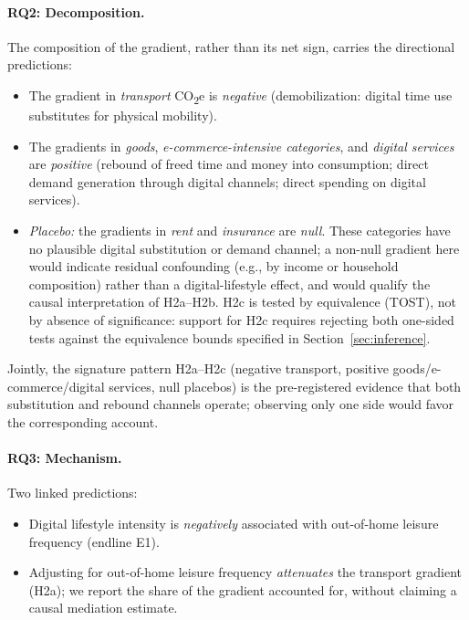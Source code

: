 \documentclass[11pt,a4paper]{article}
\begin{document}
\paragraph{RQ2: Decomposition.} The composition of the gradient, rather than its
net sign, carries the directional predictions:
\begin{itemize}
  \item[H2a.] The gradient in \emph{transport} CO\textsubscript{2}e is
    \emph{negative} (demobilization: digital time use substitutes for physical
    mobility).
  \item[H2b.] The gradients in \emph{goods}, \emph{e-commerce-intensive
    categories}, and \emph{digital services} are \emph{positive} (rebound of
    freed time and money into consumption; direct demand generation through
    digital channels; direct spending on digital services).
  \item[H2c.] \emph{Placebo:} the gradients in \emph{rent} and \emph{insurance}
    are \emph{null}. These categories have no plausible digital substitution or
    demand channel; a non-null gradient here would indicate residual confounding
    (e.g., by income or household composition) rather than a digital-lifestyle
    effect, and would qualify the causal interpretation of H2a--H2b. H2c is
    tested by equivalence (TOST), not by absence of significance: support for
    H2c requires rejecting both one-sided tests against the equivalence bounds
    specified in Section~\ref{sec:inference}.
\end{itemize}
Jointly, the signature pattern H2a--H2c (negative transport, positive
goods/e-commerce/digital services, null placebos) is the pre-registered evidence
that both substitution and rebound channels operate; observing only one side
would favor the corresponding account.

\paragraph{RQ3: Mechanism.} Two linked predictions:
\begin{itemize}
  \item[H3a.] Digital lifestyle intensity is \emph{negatively} associated with
    out-of-home leisure frequency (endline E1).
  \item[H3b.] Adjusting for out-of-home leisure frequency \emph{attenuates} the
    transport gradient (H2a); we report the share of the gradient accounted for,
    without claiming a causal mediation estimate.
\end{itemize}
\end{document}
